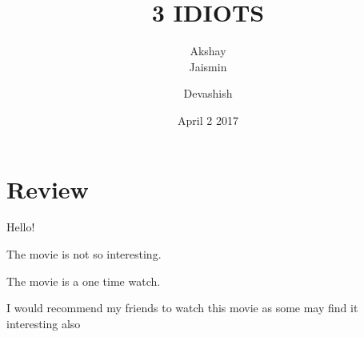 \documentclass{article}
\title{3 IDIOTS}
\author{Akshay\\Jaismin}
\author{Devashish}
\date{April 2 2017}
\begin{document}
\maketitle
\section{Review}

Hello!

The movie is not so interesting.

The movie is a one time watch.

I would recommend my friends to watch this movie as some may find it interesting also 
\end{document}
